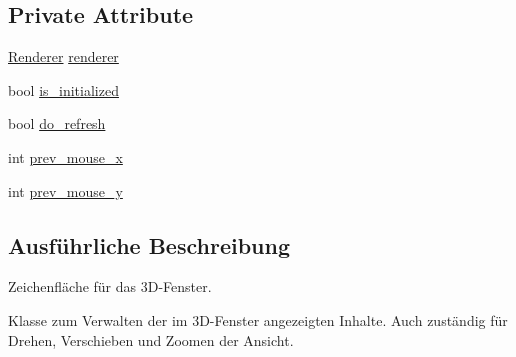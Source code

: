 \subsection*{Private Attribute}
\begin{DoxyCompactItemize}
\item 
\hyperlink{classRenderer}{Renderer} \hyperlink{classGUIGLCanvas_a33a4ad3bc364d697396c55d011bfac44}{renderer}
\item 
bool \hyperlink{classGUIGLCanvas_a59e01564652765dec69e7097c10b4455}{is\-\_\-initialized}
\item 
bool \hyperlink{classGUIGLCanvas_a7139f37aa028f71e393a0c479299455d}{do\-\_\-refresh}
\item 
int \hyperlink{classGUIGLCanvas_afc22c47a62b8d5b165a22d059816ee22}{prev\-\_\-mouse\-\_\-x}
\item 
int \hyperlink{classGUIGLCanvas_a684c82bd591f01b5f600c9589158e0e0}{prev\-\_\-mouse\-\_\-y}
\end{DoxyCompactItemize}


\subsection{Ausführliche Beschreibung}
Zeichenfläche für das 3\-D-\/\-Fenster. 

Klasse zum Verwalten der im 3\-D-\/\-Fenster angezeigten Inhalte. Auch zuständig für Drehen, Verschieben und Zoomen der Ansicht. 

